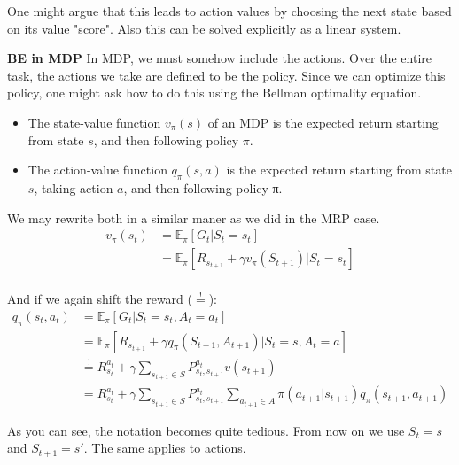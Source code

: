 \documentclass[main]{subfiles}
\begin{document}
One might argue that this leads to action values by choosing the next state based on its value "score". Also this can be solved explicitly as a linear system.


\textbf{BE in MDP}
In MDP, we must somehow include the actions. Over the entire task, the actions we take are defined to be the policy. Since we can optimize this policy, one might ask how to do this using the Bellman optimality equation.

\begin{itemize}
    \item The state-value function $v_\pi(s)$ of an MDP is the expected return starting from state $s$, and then following policy $\pi$.
    \item The action-value function $q_\pi(s,a)$ is the expected return starting from state $s$, taking action $a$, and then following policy π.
\end{itemize}

We may rewrite both in a similar maner as we did in the MRP case.
\begin{align}
    v_\pi(s_t) &= \mathbb{E}_\pi[G_t|S_t = s_t] \\
    &= \mathbb{E}_\pi[R_{s_{t+1}} + \gamma v_\pi(S_{t+1})|S_t = s_t] \\
\end{align}

And if we again shift the reward ($\overset{!}{=}$):
\begin{align}
    q_\pi(s_t,a_t)& = \mathbb{E}_\pi[G_t|S_t = s_t, A_t =a_t] \\
    &= \mathbb{E}_\pi[R_{s_{t+1}} + \gamma q_\pi(S_{t+1}, A_{t+1})|S_t = s, A_t=a] \\
    & \overset{!}{=} R_{s_t}^{a_t} + \gamma \sum_{s_{t+1} \in S} P_{s_t,s_{t+1}}^{a_t} v(s_{t+1}) \\
    & = R_{s_t}^{a_t} + \gamma \sum_{s_{t+1} \in S} P_{s_t,s_{t+1}}^{a_t} \sum_{a_{t+1} \in A} \pi(a_{t+1}|s_{t+1}) q_\pi(s_{t+1}, a_{t+1})
\end{align}

As you can see, the notation becomes quite tedious. From now on we use $S_t = s$ and $S_{t+1} = s'$. The same applies to actions.
\end{document}
